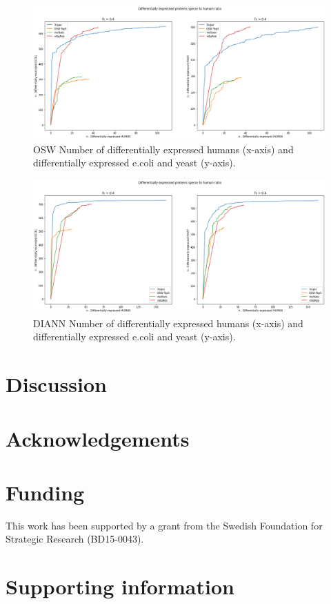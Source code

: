 \documentclass[10pt,letterpaper]{article}
\begin{document}
\begin{figure}[H]
    \centering
    \includegraphics[width=12cm]{../../result/2021-08-13_docs_plots/de_human_vs_de_specie.png}
    \caption{OSW Number of differentially expressed humans (x-axis) and differentially expressed e.coli and yeast (y-axis).}
    \label{fig:osw_de_human_vs_de_specie}
\end{figure}

\begin{figure}[H]
    \centering
    \includegraphics[width=12cm]{../../result/2021-08-13_docs_plots/DIANN_de_human_vs_de_specie.png}
    \caption{DIANN Number of differentially expressed humans (x-axis) and differentially expressed e.coli and yeast (y-axis).}
    \label{fig:DIANN_de_human_vs_de_specie}
\end{figure}

\section*{Discussion}

\section*{Acknowledgements}


\section*{Funding}

This work has been supported by a grant from the Swedish Foundation for Strategic Research (BD15-0043).

\section*{Supporting information}


%

\end{document}
